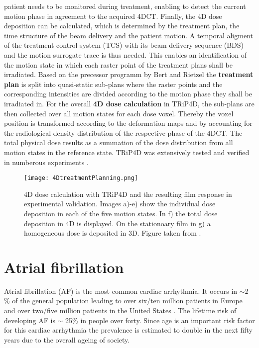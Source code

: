 \documentclass[type=dr, dr=rernat, accentcolor=tud7b,colorbacktitle, bigchapter, openright, twoside, 12pt ]{tudthesis}
\begin{document}
patient needs to be monitored during treatment, enabling to detect the current motion phase in agreement to the acquired 4DCT.
Finally, the 4D dose deposition can be calculated, which is determined by the treatment plan, the time structure of the beam delivery and 
the patient motion. A temporal aligment of the treatment control system (TCS) with its beam delivery sequence (BDS) and the motion 
surrogate trace is thus needed. This enables an identification of the motion state in which each raster point of the treatment plans 
shall be irradiated. Based on the precessor programm by Bert and Rietzel the \textbf{treatment plan} is split into quasi-static sub-plans 
where the raster points and the corresponding intensities are divided according to the motion phase they shall be irradiated in. 
For the overall \textbf{4D dose calculation} in TRiP4D, the sub-plans are then collected over all motion states for each dose voxel. Thereby 
the voxel position is transformed according to the deformation maps and by accounting for the radiological density distribution of 
the respective phase of the 4DCT. The total physical dose results as a summation of the dose distribution from all motion states in 
the reference state. TRiP4D was extensively tested and verified in numberous experiments \cite{Ric12}.  


\begin{figure}[H]
\begin{center}
\texttt{[image: 4DtreatmentPlanning.png]}
\caption{4D dose calculation with TRiP4D and the resulting film response in experimental validation. Images a)-e) show the individual dose 
deposition in each of the five motion states. In f) the total dose deposition in 4D is displayed. On the stationoary film in g) a homogeneous 
dose is deposited in 3D. Figure taken from \cite{Ric12}.}
\end{center}
\end{figure}



\newpage

\section{Atrial fibrillation}

Atrial fibrillation (AF) is the most common cardiac arrhythmia. It occurs in $\sim$2 \% of the general population leading to over six/ten million 
patients in Europe \cite{ESC10} and over two/five million patients in the United States \cite{CE09}. The lifetime risk of developing AF is 
$\sim$ 25\% in people over forty. Since age is an important risk factor for this cardiac arrhythmia the prevalence is estimated to double in 
the next fifty years due to the overall ageing of society.\newline
\end{document}
